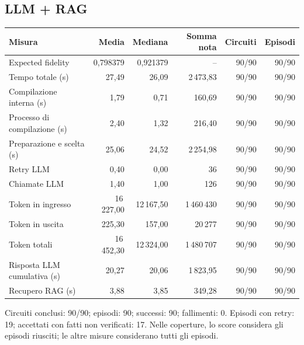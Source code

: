 \subsection{LLM + RAG}
\begingroup\footnotesize
\setlength{\tabcolsep}{5pt}
\begin{center}
\begin{tabular}{lrrrrr}
\toprule
Misura & Media & Mediana & Somma nota & Circuiti & Episodi \\
\midrule
Expected fidelity & 0,798379 & 0,921379 & -- & 90/90 & 90/90 \\
Tempo totale (s) & 27,49 & 26,09 & 2\,473,83 & 90/90 & 90/90 \\
Compilazione interna (s) & 1,79 & 0,71 & 160,69 & 90/90 & 90/90 \\
Processo di compilazione (s) & 2,40 & 1,32 & 216,40 & 90/90 & 90/90 \\
Preparazione e scelta (s) & 25,06 & 24,52 & 2\,254,98 & 90/90 & 90/90 \\
Retry LLM & 0,40 & 0,00 & 36 & 90/90 & 90/90 \\
Chiamate LLM & 1,40 & 1,00 & 126 & 90/90 & 90/90 \\
Token in ingresso & 16\,227,00 & 12\,167,50 & 1\,460\,430 & 90/90 & 90/90 \\
Token in uscita & 225,30 & 157,00 & 20\,277 & 90/90 & 90/90 \\
Token totali & 16\,452,30 & 12\,324,00 & 1\,480\,707 & 90/90 & 90/90 \\
Risposta LLM cumulativa (s) & 20,27 & 20,06 & 1\,823,95 & 90/90 & 90/90 \\
Recupero RAG (s) & 3,88 & 3,85 & 349,28 & 90/90 & 90/90 \\
\bottomrule
\end{tabular}
\end{center}
\endgroup
Circuiti conclusi: 90/90; episodi: 90; successi: 90; fallimenti: 0. Episodi con retry: 19; accettati con fatti non verificati: 17. Nelle coperture, lo score considera gli episodi riusciti; le altre misure considerano tutti gli episodi.

